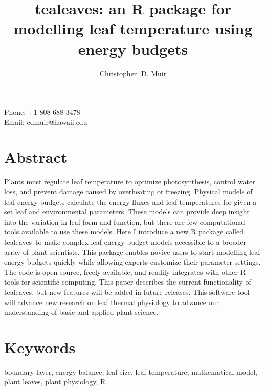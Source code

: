 \documentclass[11pt, oneside]{article}
\newcommand{\pkg}[1]{{\fontseries{b}\selectfont #1}}
\newcommand{\tealeaves}{\pkg{tealeaves}}
\begin{document}


\title{\tealeaves: an R package for modelling leaf temperature using energy budgets}
\author[1]{Christopher. D. Muir}
\date{} %


{\let\newpage\relax\maketitle}

Phone: +1 808-688-3478 \\
Email: cdmuir@hawaii.edu %

\section*{Abstract}

Plants must regulate leaf temperature to optimize photosynthesis, control water loss, and prevent damage caused by overheating or freezing. Physical models of leaf energy budgets calculate the energy fluxes and leaf temperatures for given a set leaf and environmental parameters. These models can provide deep insight into the variation in leaf form and function, but there are few computational tools available to use these models. Here I introduce a new R package called \tealeaves~to make complex leaf energy budget models accessible to a broader array of plant scientists. This package enables novice users to start modelling leaf energy budgets quickly while allowing experts customize their parameter settings. The code is open source, freely available, and readily integrates with other R tools for scientific computing. This paper describes the current functionality of \tealeaves, but new features will be added in future releases. This software tool will advance new research on leaf thermal physiology to advance our understanding of basic and applied plant science.

\section*{Keywords}

boundary layer, energy balance, leaf size, leaf temperature, mathematical model, plant leaves, plant physiology, R
\end{document}
